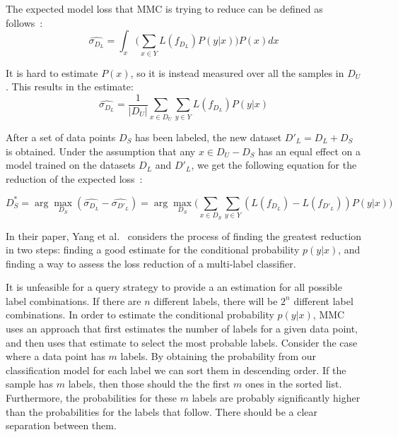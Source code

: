 The expected model loss that MMC is trying to reduce can be defined as follows~\cite{yang2009effective}:
\begin{equation}
    \widehat{\sigma_{D_L}} = \int_x \bigg ( \sum_{x \in Y} L(f_{D_L})P(y|x) \bigg ) P(x)dx
\end{equation}

It is hard to estimate $P(x)$, so it is instead measured over all the samples in $D_U$.
This results in the estimate:
\begin{equation}
    \widehat{\sigma_{D_L}} = \frac{1}{|D_U|} \sum_{x \in D_U} \sum_{y \in Y} L(f_{D_L})P(y|x)
\end{equation}

After a set of data points $D_S$ has been labeled, the new dataset $D'_L=D_L + D_S$ is obtained.
Under the assumption that any $x \in D_U - D_S$ has an equal effect on a model trained on the datasets $D_L$ and $D'_L$, we get the following equation for the reduction of the expected loss~\cite{yang2009effective}:

\begin{equation}
    D^*_S = \arg\max_{D_S}(\widehat{\sigma_{D_L}} - \widehat{\sigma_{D'_L}}) = \arg\max_{D_S} \big ( \sum_{x \in D_S} \sum_{y \in Y} (L(f_{D_L}) - L(f_{D'_L})) P(y|x) \big )
\end{equation}

In their paper, Yang et al\@.~\cite{yang2009effective} considers the process of finding the greatest reduction in two steps: finding a good estimate for the conditional probability $p(y|x)$, and finding a way to assess the loss reduction of a multi-label classifier.

It is unfeasible for a query strategy to provide a an estimation for all possible label combinations.
If there are $n$ different labels, there will be $2^n$ different label combinations.
In order to estimate the conditional probability $p(y|x)$, MMC uses an approach that first estimates the number of labels for a given data point, and then uses that estimate to select the most probable labels.
Consider the case where a data point has $m$ labels.
By obtaining the probability from our classification model for each label we can sort them in descending order.
If the sample has $m$ labels, then those should the the first $m$ ones in the sorted list.
Furthermore, the probabilities for these $m$ labels are probably significantly higher than the probabilities for the labels that follow.
There should be a clear separation between them.

